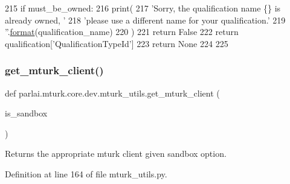 \begin{DoxyCode}
215             \textcolor{keywordflow}{if} must\_be\_owned:
216                 print(
217                     \textcolor{stringliteral}{'Sorry, the qualification name \{\} is already owned, '}
218                     \textcolor{stringliteral}{'please use a different name for your qualification.'}
219                     \textcolor{stringliteral}{''}.\hyperlink{namespaceparlai_1_1chat__service_1_1services_1_1messenger_1_1shared__utils_a32e2e2022b824fbaf80c747160b52a76}{format}(qualification\_name)
220                 )
221                 \textcolor{keywordflow}{return} \textcolor{keyword}{False}
222             \textcolor{keywordflow}{return} qualification[\textcolor{stringliteral}{'QualificationTypeId'}]
223     \textcolor{keywordflow}{return} \textcolor{keywordtype}{None}
224 
225 
\end{DoxyCode}
\mbox{\label{namespaceparlai_1_1mturk_1_1core_1_1dev_1_1mturk__utils_ad9e4ecfca00663796f26ca16a2778f29}} 
\subsubsection{\texorpdfstring{get\+\_\+mturk\+\_\+client()}{get\_mturk\_client()}}
{\footnotesize\ttfamily def parlai.\+mturk.\+core.\+dev.\+mturk\+\_\+utils.\+get\+\_\+mturk\+\_\+client (\begin{DoxyParamCaption}\item[{}]{is\+\_\+sandbox }\end{DoxyParamCaption})}

\begin{DoxyVerb}Returns the appropriate mturk client given sandbox option.
\end{DoxyVerb}
 

Definition at line 164 of file mturk\+\_\+utils.\+py.



